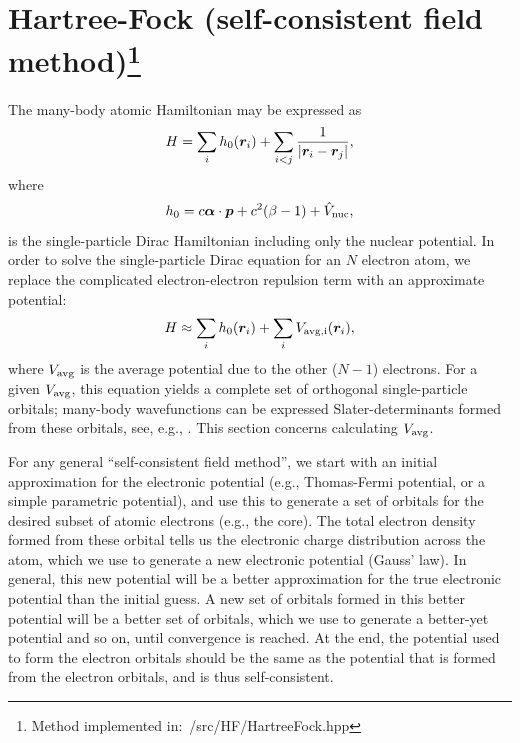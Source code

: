 \documentclass[10pt,twocolumn,a4paper]{article}%
\renewcommand{\v}[1]{\ensuremath{\boldsymbol{#1}}}		%
\newcommand{\be}{\begin{equation}}
\newcommand{\ee}{\end{equation}}
\def\en{\ensuremath{\varepsilon}}
\begin{document}


\section[Hartree-Fock (self-consistent field method)]{Hartree-Fock (self-consistent field method)\footnote{Method implemented in:~/src/HF/HartreeFock.hpp}}


The many-body atomic Hamiltonian may be expressed as
\be\label{eq:H-manybody}
H = \sum_i h_{\rm 0}(\v{r}_i) + \sum_{i<j}\frac{1}{|\v{r}_i-\v{r}_j|},
\ee
where
\[h_0 = c \v{\alpha}\cdot\v{p} + c^2(\beta-1) + \hat V_{\rm nuc},\]
is the single-particle Dirac Hamiltonian including only the nuclear potential.
In order to solve the single-particle Dirac equation for an $N$ electron atom, we replace the complicated electron-electron repulsion term with an approximate potential:
\be
H \approx \sum_i h_{\rm 0}(\v{r}_i) + \sum_{i}V_{\rm avg, i}(\v{r}_i),
\ee
where $V_{\rm avg}$ is the average potential due to the other ($N-1$) electrons.
For a given $V_{\rm avg}$, this equation yields a complete set of orthogonal single-particle orbitals; many-body wavefunctions can be expressed Slater-determinants formed from these orbitals, see, e.g., \cite{JohnsonBook2007,Lindgren1986}.
This section concerns calculating $V_{\rm avg}$.


For any general ``self-consistent field method'', we start with an initial approximation for the electronic potential (e.g., Thomas-Fermi potential, or a simple parametric potential), and use this to generate a set of orbitals for the desired subset of atomic electrons (e.g., the core).
The total electron density formed from these orbital tells us the electronic charge distribution across the atom, which we use to generate a new electronic potential (Gauss' law).
In general, this new potential will be a better approximation for the true electronic potential than the initial guess.
A new set of orbitals formed in this better potential will be a better set of orbitals, which we use to generate a better-yet potential and so on, until convergence is reached.
At the end, the potential used to form the electron orbitals should be the same as the potential that is formed from the electron orbitals, and is thus self-consistent.
\end{document}
